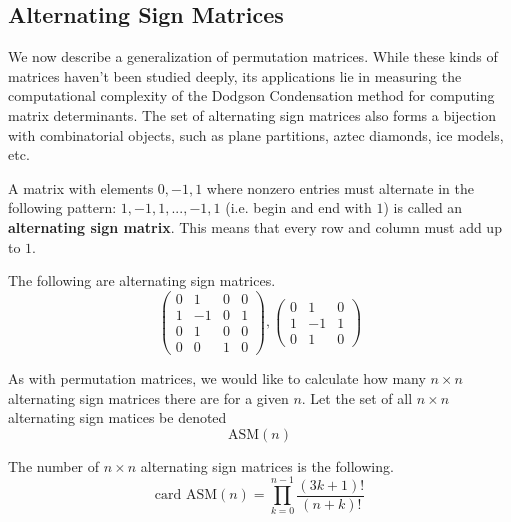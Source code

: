 \subsection{Alternating Sign Matrices}

  We now describe a generalization of permutation matrices. While these kinds of matrices haven't been studied deeply, its applications lie in measuring the computational complexity of the Dodgson Condensation method for computing matrix determinants. The set of alternating sign matrices also forms a bijection with combinatorial objects, such as plane partitions, aztec diamonds, ice models, etc. 

  \begin{definition}
  A matrix with elements $0, -1, 1$ where nonzero entries must alternate in the following pattern: $1, -1, 1, ..., -1, 1$ (i.e. begin and end with $1$) is called an \textbf{alternating sign matrix}. This means that every row and column must add up to $1$. 
  \end{definition}

  \begin{example}
  The following are alternating sign matrices. 
  \[\begin{pmatrix}
  0&1&0&0\\1&-1&0&1\\0&1&0&0\\0&0&1&0
  \end{pmatrix}, \begin{pmatrix}
  0&1&0\\1&-1&1\\0&1&0
  \end{pmatrix}\]
  \end{example}

  As with permutation matrices, we would like to calculate how many $n \times n$ alternating sign matrices there are for a given $n$. Let the set of all $n \times n$ alternating sign matices be denoted
  \begin{equation}
    \text{ASM}(n)
  \end{equation}

  \begin{proposition}
  The number of $n \times n$ alternating sign matrices is the following. 
  \begin{equation}
    \text{card ASM}(n) = \prod_{k=0}^{n-1} \frac{(3k+1)!}{(n+k)!}
  \end{equation}
  \end{proposition}


